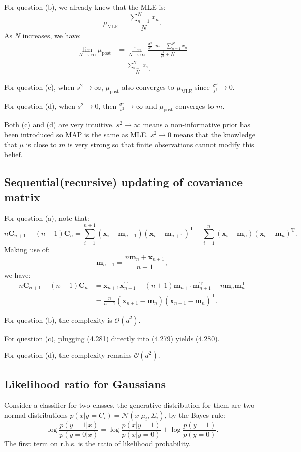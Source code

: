 \documentclass[UTF8]{ctexart}
\begin{document}
For question (b), we already knew that the MLE is:
$$\mu_{\text{MLE}}=\frac{\sum_{n=1}^{N}x_{n}}{N}.$$
As $N$ increases, we have:
$$
\begin{aligned}
\lim_{N\rightarrow\infty}\mu_{\text{post}}&=\lim_{N\rightarrow\infty} \frac{\frac{\sigma^{2}}{s^{2}}\cdot m+\sum_{n=1}^{N}x_{n}}{\frac{\sigma^{2}}{s^{2}}+N}\\
&=\frac{\sum_{n=1}^{N}x_{n}}{N}.
\end{aligned}
$$

For question (c), when $s^{2}\rightarrow\infty$, $\mu_{\text{post}}$ also converges to $\mu_{\text{MLE}}$ since $\frac{\sigma^{2}}{s^{2}}\rightarrow 0$.

For question (d), when $s^{2}\rightarrow 0$, then $\frac{\sigma^{2}}{s^{2}}\rightarrow \infty$ and $\mu_{\text{post}}$ converges to $m$.

Both (c) and (d) are very intuitive.
$s^{2}\rightarrow\infty$ means a non-informative prior has been introduced so MAP is the same as MLE.
$s^{2}\rightarrow 0$ means that the knowledge that $\mu$ is close to $m$ is very strong so that finite observations cannot modify this belief.

\subsection{Sequential(recursive) updating of covariance matrix}
For question (a), note that:
$$n\textbf{C}_{n+1}-(n-1)\textbf{C}_{n}=\sum_{i=1}^{n+1}(\textbf{x}_{i}-\textbf{m}_{n+1})(\textbf{x}_{i}-\textbf{m}_{n+1})^{\text{T}}-\sum_{i=1}^{n}(\textbf{x}_{i}-\textbf{m}_{n})(\textbf{x}_{i}-\textbf{m}_{n})^{\text{T}}.$$
Making use of:
$$\textbf{m}_{n+1}=\frac{n\textbf{m}_{n}+\textbf{x}_{n+1}}{n+1},$$
we have:
$$
\begin{aligned}
n\textbf{C}_{n+1}-(n-1)\textbf{C}_{n}&=\textbf{x}_{n+1}\textbf{x}_{n+1}^{\text{T}}-(n+1)\textbf{m}_{n+1}\textbf{m}_{n+1}^{\text{T}}+n\textbf{m}_{n}\textbf{m}_{n}^{\text{T}}\\
&=\frac{n}{n+1}(\textbf{x}_{n+1}-\textbf{m}_{n})(\textbf{x}_{n+1}-\textbf{m}_{n})^{\text{T}}.
\end{aligned}
$$

For question (b), the complexity is $\mathcal{O}(d^{2})$.

For question (c), plugging (4.281) directly into (4.279) yields (4.280).

For question (d), the complexity remains $\mathcal{O}(d^{2})$.

\subsection{Likelihood ratio for Gaussians}
Consider a classifier for two classes, the generative distribution for them are two normal distributions $p(x|y=C_{i})=\mathcal{N}(x|\mu_{i},\Sigma_{i})$, by the Bayes rule:
$$\log \frac{p(y=1|x)}{p(y=0|x)} = \log \frac{p(x|y=1)}{p(x|y=0)} + \log \frac{p(y=1)}{p(y=0)}.$$
The first term on r.h.s. is the ratio of likelihood probability.
\end{document}
